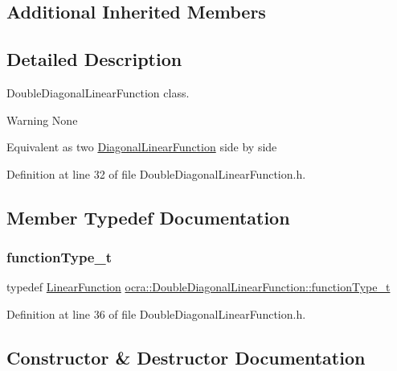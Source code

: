 \subsection*{Additional Inherited Members}


\subsection{Detailed Description}
Double\+Diagonal\+Linear\+Function class. 

\begin{DoxyWarning}{Warning}
None
\end{DoxyWarning}
Equivalent as two \hyperlink{classocra_1_1DiagonalLinearFunction}{Diagonal\+Linear\+Function} side by side 

Definition at line 32 of file Double\+Diagonal\+Linear\+Function.\+h.



\subsection{Member Typedef Documentation}
\hypertarget{classocra_1_1DoubleDiagonalLinearFunction_a69a17b7aa1e34b31ac1cc18cca3a3b38}{}\label{classocra_1_1DoubleDiagonalLinearFunction_a69a17b7aa1e34b31ac1cc18cca3a3b38} 
\subsubsection{\texorpdfstring{function\+Type\+\_\+t}{functionType\_t}}
{\footnotesize\ttfamily typedef \hyperlink{classocra_1_1LinearFunction}{Linear\+Function} \hyperlink{classocra_1_1DoubleDiagonalLinearFunction_a69a17b7aa1e34b31ac1cc18cca3a3b38}{ocra\+::\+Double\+Diagonal\+Linear\+Function\+::function\+Type\+\_\+t}}



Definition at line 36 of file Double\+Diagonal\+Linear\+Function.\+h.



\subsection{Constructor \& Destructor Documentation}
\hypertarget{classocra_1_1DoubleDiagonalLinearFunction_a790df03af5df25353682965f7a556aec}{}\label{classocra_1_1DoubleDiagonalLinearFunction_a790df03af5df25353682965f7a556aec} 
